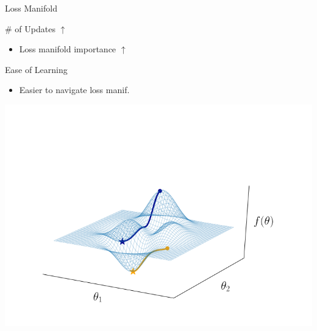\documentclass[aspectratio=169]{beamer}
\begin{document}
\begin{frame}{Loss Manifold}
	\begin{minipage}{0.40\textwidth}
		\begin{block}{\color{White}\# of Updates $\uparrow$}
		\begin{itemize}
			\item Loss manifold importance $\uparrow$
		\end{itemize}
		\end{block}
		\begin{block}{\color{White}Ease of Learning}
			\begin{itemize}
				\item Easier to navigate loss manif.
			\end{itemize}
		\end{block}
	\end{minipage}%
		\hspace{1cm}
	\begin{minipage}{0.5\textwidth}
		\includegraphics[width=\textwidth]{Figures/loss}
	\end{minipage}
\end{frame}
\end{document}
